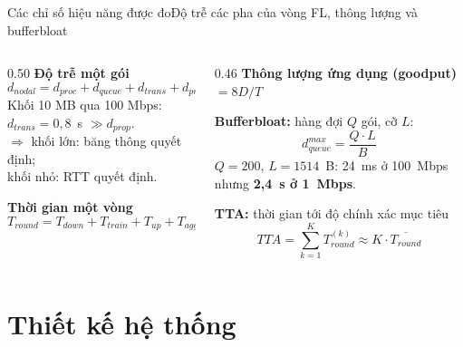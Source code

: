 \documentclass[aspectratio=169,10pt]{beamer}
\begin{document}
\begin{frame}{Các chỉ số hiệu năng được đo}{Độ trễ các pha của vòng FL, thông lượng và bufferbloat}
  \begin{columns}[T]
    \begin{column}{0.50\textwidth}
      \textbf{Độ trễ một gói}~\cite{kurose2021computer}
      \[ d_{nodal} = d_{proc} + d_{queue} + d_{trans} + d_{prop} \]
      Khối 10 MB qua 100 Mbps: $d_{trans} = 0{,}8$~s $\gg d_{prop}$.\\
      $\Rightarrow$ khối lớn: băng thông quyết định;\\ khối nhỏ: RTT quyết định.

      \vspace{6pt}
      \textbf{Thời gian một vòng}
      \[ T_{round} = T_{down} + T_{train} + T_{up} + T_{agg} \]
    \end{column}
    \begin{column}{0.46\textwidth}
      \textbf{Thông lượng ứng dụng (goodput)} $= 8D/T$
      \vspace{6pt}

      \textbf{Bufferbloat:} hàng đợi $Q$ gói, cỡ $L$:
      \[ d_{queue}^{max} = \frac{Q \cdot L}{B} \]
      $Q = 200$, $L = 1514$~B: 24~ms ở 100~Mbps nhưng \textbf{2,4~s ở 1~Mbps}.
      \vspace{6pt}

      \textbf{TTA:} thời gian tới độ chính xác mục tiêu
      \[ TTA = \textstyle\sum_{k=1}^{K} T_{round}^{(k)} \approx K \cdot \overline{T_{round}} \]
    \end{column}
  \end{columns}
\end{frame}

\section{Thiết kế hệ thống}
\end{document}
